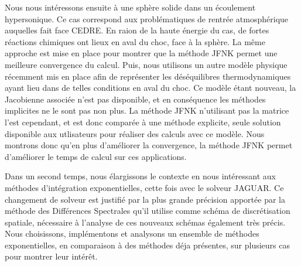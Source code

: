 Nous nous intéressons ensuite à une sphère solide dans un écoulement hypersonique.
Ce cas correspond aux problématiques de rentrée atmosphérique auquelles fait face CEDRE.
En raion de la haute énergie du cas, de fortes réactions chimiques ont lieux en aval du choc, face à la sphère.
La même approche est mise en place pour montrer que la méthode JFNK permet une meilleure convergence du calcul.
Puis, nous utilisons un autre modèle physique récemment mis en place afin de représenter les déséquilibres thermodynamiques ayant lieu dans de telles conditions en aval du choc.
Ce modèle étant nouveau, la Jacobienne associée n'est pas disponible, et en conséquence les méthodes implicites ne le sont pas non plus.
La méthode JFNK n'utilisant pas la matrice l'est cependant, et est donc comparée à une méthode explicite, seule solution disponible aux utlisateurs pour réaliser des calculs avec ce modèle.
Nous montrons donc qu'en plus d'améliorer la convergence, la méthode JFNK permet d'améliorer le temps de calcul sur ces applications.

Dans un second temps, nous élargissons le contexte en nous intéressant aux méthodes d'intégration exponentielles, cette fois avec le solveur JAGUAR.
Ce changement de solveur est justifié par la plus grande précision apportée par la méthode des Différences Spectrales qu'il utilise comme schéma de discrétisation spatiale, nécessaire à l'analyse de ces nouveaux schémas également très précis.
Nous choisissons, implémentons et analysons un ensemble de méthodes exponentielles, en comparaison à des méthodes déja présentes, sur plusieurs cas pour montrer leur intérêt.
